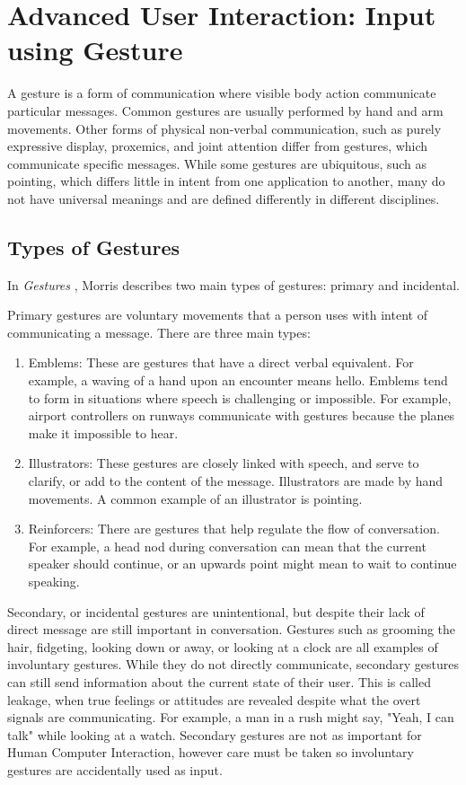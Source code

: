 \section{Advanced User Interaction: Input using Gesture}

A gesture is a form of communication where visible body action communicate particular messages.
Common gestures are usually performed by hand and arm movements.
Other forms of physical non-verbal communication, such as purely expressive display, proxemics, and joint attention differ from gestures, which communicate specific messages.
While some gestures are ubiquitous, such as pointing, which differs little in intent from one application to another, many do not have universal meanings and are defined differently in different disciplines.

\subsection{Types of Gestures}

In \textit{Gestures} \cite{morris79}, Morris describes two main types of gestures: primary and incidental.

Primary gestures are voluntary movements that a person uses with intent of communicating a message. There are three main types:
\begin{enumerate}
\item Emblems: These are gestures that have a direct verbal equivalent. 
For example, a waving of a hand upon an encounter means hello. 
Emblems tend to form in situations where speech is challenging or impossible.
For example, airport controllers on runways communicate with gestures because the planes make it impossible to hear.
\item Illustrators: These gestures are closely linked with speech, and serve to clarify, or add to the content of the message. 
Illustrators are made by hand movements.
A common example of an illustrator is pointing.
\item Reinforcers: There are gestures that help regulate the flow of conversation.
For example, a head nod during conversation can mean that the current speaker should continue, or an upwards point might mean to wait to continue speaking.
\end{enumerate}

Secondary, or incidental gestures are unintentional, but despite their lack of direct message are still important in conversation.
Gestures such as grooming the hair, fidgeting, looking down or away, or looking at a clock are all examples of involuntary gestures.
While they do not directly communicate, secondary gestures can still send information about the current state of their user.
This is called leakage, when true feelings or attitudes are revealed despite what the overt signals are communicating.
For example, a man in a rush might say, "Yeah, I can talk" while looking at a watch.
Secondary gestures are not as important for Human Computer Interaction, however care must be taken so involuntary gestures are accidentally used as input. 

